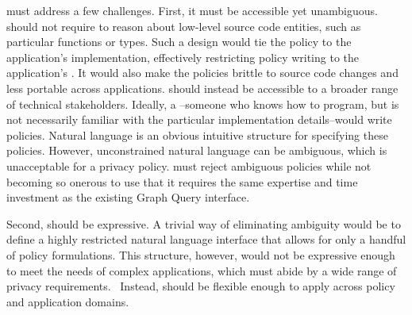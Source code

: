 {\syslang{} must address a few challenges.
%
First, it must be accessible yet unambiguous.
%
\syslang{} should not require \writers{} to reason about low-level source code entities, such as particular functions or types.
%
Such a design would tie the policy to the application's implementation, effectively restricting policy writing to the application's \devs.
%
It would also make the policies brittle to source code changes and less portable across applications.
%
\syslang{} should instead be accessible to a broader range of technical stakeholders.
%
Ideally, a \ce--someone who knows how to program, but is not necessarily familiar with the particular implementation details--would write policies.
%
Natural language is an obvious intuitive structure for specifying these policies.
%
However, unconstrained natural language can be ambiguous, which is unacceptable for a privacy policy.
%
\syslang{} must reject ambiguous policies while not becoming so onerous to use that it 
requires the same expertise and time investment as the existing Graph Query interface.

Second, \syslang{} should be expressive.
%
A trivial way of eliminating ambiguity would be to define a highly restricted natural language interface that allows for only a handful of policy formulations.
%
This structure, however, would not be expressive enough to meet the needs of complex applications, 
which must abide by a wide range of privacy requirements.~\cite{todo}
%
Instead, \syslang{} should be flexible enough to apply across policy and application domains.

}
